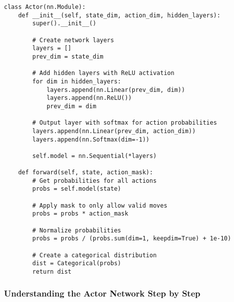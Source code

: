 \documentclass[11pt]{article}
\begin{document}
\begin{lstlisting}[style=Python]
class Actor(nn.Module):
    def __init__(self, state_dim, action_dim, hidden_layers):
        super().__init__()
        
        # Create network layers
        layers = []
        prev_dim = state_dim
        
        # Add hidden layers with ReLU activation
        for dim in hidden_layers:
            layers.append(nn.Linear(prev_dim, dim))
            layers.append(nn.ReLU())
            prev_dim = dim
        
        # Output layer with softmax for action probabilities
        layers.append(nn.Linear(prev_dim, action_dim))
        layers.append(nn.Softmax(dim=-1))
        
        self.model = nn.Sequential(*layers)
        
    def forward(self, state, action_mask):
        # Get probabilities for all actions
        probs = self.model(state)
        
        # Apply mask to only allow valid moves
        probs = probs * action_mask
        
        # Normalize probabilities
        probs = probs / (probs.sum(dim=1, keepdim=True) + 1e-10)
        
        # Create a categorical distribution
        dist = Categorical(probs)
        return dist
\end{lstlisting}

\subsubsection*{Understanding the Actor Network Step by Step}

\onecolumn
\end{document}
